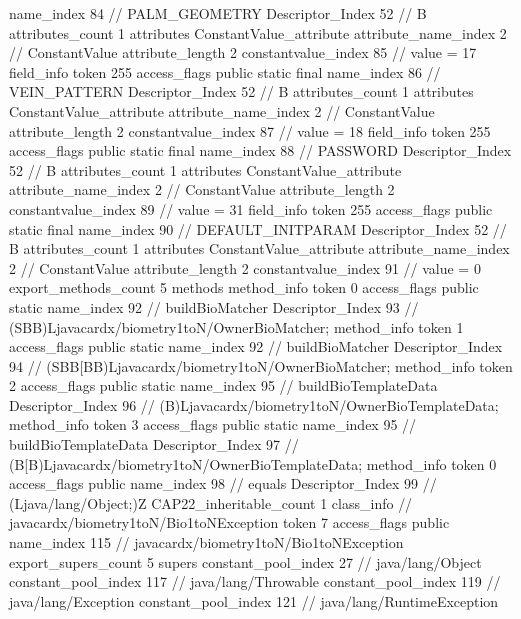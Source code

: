 {{{{{				name_index	84		// PALM_GEOMETRY
				Descriptor_Index	52		// B
				attributes_count	1
				attributes {
				ConstantValue_attribute {
					attribute_name_index	2		// ConstantValue
					attribute_length	2
					constantvalue_index	85		// value = 17
				}
				}
			}
			field_info {
				token	255
				access_flags	public static final
				name_index	86		// VEIN_PATTERN
				Descriptor_Index	52		// B
				attributes_count	1
				attributes {
				ConstantValue_attribute {
					attribute_name_index	2		// ConstantValue
					attribute_length	2
					constantvalue_index	87		// value = 18
				}
				}
			}
			field_info {
				token	255
				access_flags	public static final
				name_index	88		// PASSWORD
				Descriptor_Index	52		// B
				attributes_count	1
				attributes {
				ConstantValue_attribute {
					attribute_name_index	2		// ConstantValue
					attribute_length	2
					constantvalue_index	89		// value = 31
				}
				}
			}
			field_info {
				token	255
				access_flags	public static final
				name_index	90		// DEFAULT_INITPARAM
				Descriptor_Index	52		// B
				attributes_count	1
				attributes {
				ConstantValue_attribute {
					attribute_name_index	2		// ConstantValue
					attribute_length	2
					constantvalue_index	91		// value = 0
				}
				}
			}
			}
			export_methods_count	5
			methods {
				method_info {
					token	0
					access_flags	public static
					name_index	92		// buildBioMatcher
					Descriptor_Index	93		// (SBB)Ljavacardx/biometry1toN/OwnerBioMatcher;
				}
				method_info {
					token	1
					access_flags	public static
					name_index	92		// buildBioMatcher
					Descriptor_Index	94		// (SBB[BB)Ljavacardx/biometry1toN/OwnerBioMatcher;
				}
				method_info {
					token	2
					access_flags	public static
					name_index	95		// buildBioTemplateData
					Descriptor_Index	96		// (B)Ljavacardx/biometry1toN/OwnerBioTemplateData;
				}
				method_info {
					token	3
					access_flags	public static
					name_index	95		// buildBioTemplateData
					Descriptor_Index	97		// (B[B)Ljavacardx/biometry1toN/OwnerBioTemplateData;
				}
				method_info {
					token	0
					access_flags	public
					name_index	98		// equals
					Descriptor_Index	99		// (Ljava/lang/Object;)Z
				}
			}
			CAP22_inheritable_count	1
		}
		class_info {		// javacardx/biometry1toN/Bio1toNException
			token	7
			access_flags	public
			name_index	115		// javacardx/biometry1toN/Bio1toNException
			export_supers_count	5
			supers {
				constant_pool_index	27		// java/lang/Object
				constant_pool_index	117		// java/lang/Throwable
				constant_pool_index	119		// java/lang/Exception
				constant_pool_index	121		// java/lang/RuntimeException
}}}}
